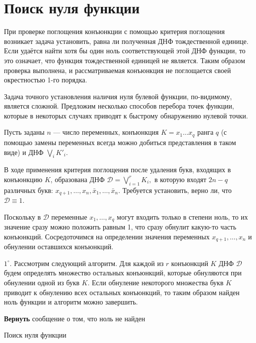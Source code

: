 \documentclass[12pt,a4paper,oneside,fleqn,leqno]{article}
\theoremstyle{definition}
\begin{document}
	\section{Поиск нуля функции}
		При проверке поглощения конъюнкции с помощью критерия поглощения возникает задача установить, равна ли полученная ДНФ тождественной единице. Если удаётся найти хотя бы один ноль соответствующей этой ДНФ функции, то это означает, что функция тождественной единицей не является. Таким образом проверка выполнена, и рассматриваемая конъюнкция не поглощается своей окрестностью 1-го порядка.\par
		Задача точного установления наличия нуля булевой функции, по-видимому, является сложной. Предложим несколько способов перебора точек функции, которые в некоторых случаях приводят к быстрому обнаружению нулевой точки.\par
		Пусть заданы $n$ --- число переменных, конъюнкция $K = x_1\ldots x_q$ ранга $q$ (с помощью замены переменных всегда можно добиться представления в таком виде) и ДНФ $\bigvee\limits_iK'_i.$\par
		В ходе применения критерия поглощения после удаления букв, входящих в конъюнкцию $K$, образована ДНФ $\mathcal{D} = \bigvee\limits_{i = 1}^rK_i,$ в которую входят $2n - q$ различных букв: $x_{q + 1},\ldots, x_n, \bar{x}_1,\ldots,\bar{x}_n$. Требуется установить, верно ли, что $\mathcal{D} \equiv 1.$\par
		Поскольку в $\mathcal{D}$ переменные $x_1,\ldots, x_q$ могут входить только в степени ноль, то их значение сразу можно положить равным 1, что сразу обнулит какую-то часть конъюнкций. Сосредоточимся на определении значения переменных $x_{q + 1},\ldots, x_n$ и обнулении оставшихся конъюнкций.\par
		$1^{\circ}.$ Рассмотрим следующий алгоритм. Для каждой из $r$ конъюнкций $K$ ДНФ $\mathcal{D}$ будем определять множество остальных конъюнкций, которые обнуляются при обнулении одной из букв $K.$ Если обнуление некоторого множества букв $K$ приводит к обнулению всех остальных конъюнкций, то таким образом найден ноль функции и алгоритм можно завершить.\par
		\begin{algorithm}[H]
				\SetAlgoLined
				\textbf{Вернуть} сообщение о том, что ноль не найден\;
			\caption{Поиск нуля функции}
			\label{all_conj}
		\end{algorithm}\par
\end{document}
